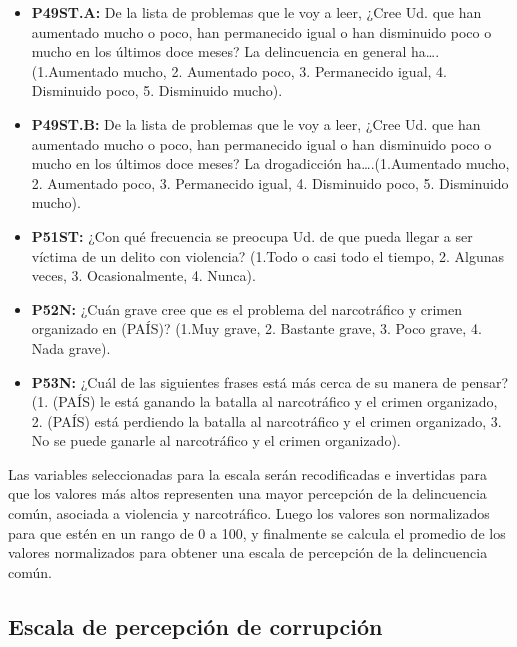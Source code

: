 \documentclass[
  spanish,
  a4paper,
  oneside]{scrbook}
\providecommand{\tightlist}{%
  \setlength{\itemsep}{0pt}\setlength{\parskip}{0pt}}
\begin{document}
\begin{itemize}
\tightlist
\item
  \textbf{P49ST.A:} De la lista de problemas que le voy a leer, ¿Cree
  Ud. que han aumentado mucho o poco, han permanecido igual o han
  disminuido poco o mucho en los últimos doce meses? La delincuencia en
  general ha\ldots.(1.Aumentado mucho, 2. Aumentado poco, 3. Permanecido
  igual, 4. Disminuido poco, 5. Disminuido mucho).
\item
  \textbf{P49ST.B:} De la lista de problemas que le voy a leer, ¿Cree
  Ud. que han aumentado mucho o poco, han permanecido igual o han
  disminuido poco o mucho en los últimos doce meses? La drogadicción
  ha\ldots.(1.Aumentado mucho, 2. Aumentado poco, 3. Permanecido igual,
  4. Disminuido poco, 5. Disminuido mucho).
\item
  \textbf{P51ST:} ¿Con qué frecuencia se preocupa Ud. de que pueda
  llegar a ser víctima de un delito con violencia? (1.Todo o casi todo
  el tiempo, 2. Algunas veces, 3. Ocasionalmente, 4. Nunca).
\item
  \textbf{P52N:} ¿Cuán grave cree que es el problema del narcotráfico y
  crimen organizado en (PAÍS)? (1.Muy grave, 2. Bastante grave, 3. Poco
  grave, 4. Nada grave).
\item
  \textbf{P53N:} ¿Cuál de las siguientes frases está más cerca de su
  manera de pensar? (1. (PAÍS) le está ganando la batalla al
  narcotráfico y el crimen organizado, 2. (PAÍS) está perdiendo la
  batalla al narcotráfico y el crimen organizado, 3. No se puede ganarle
  al narcotráfico y el crimen organizado).
\end{itemize}

Las variables seleccionadas para la escala serán recodificadas e
invertidas para que los valores más altos representen una mayor
percepción de la delincuencia común, asociada a violencia y
narcotráfico. Luego los valores son normalizados para que estén en un
rango de 0 a 100, y finalmente se calcula el promedio de los valores
normalizados para obtener una escala de percepción de la delincuencia
común.

\subsection{Escala de percepción de
corrupción}\label{escala-de-percepciuxf3n-de-corrupciuxf3n}
\end{document}
